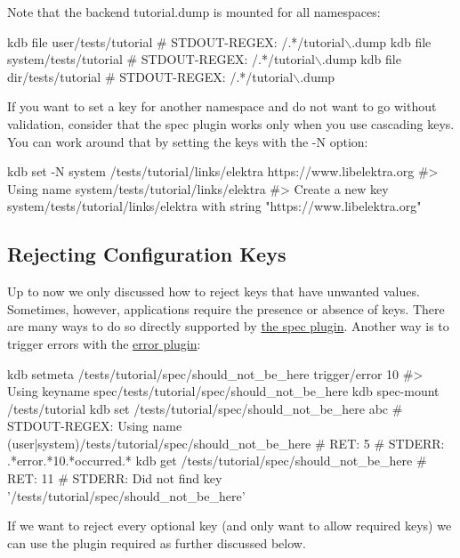 Note that the backend {\ttfamily tutorial.\+dump} is mounted for all namespaces\+:


\begin{DoxyCode}
kdb file user/tests/tutorial
# STDOUT-REGEX: /.*/tutorial\(\backslash\).dump
kdb file system/tests/tutorial
# STDOUT-REGEX: /.*/tutorial\(\backslash\).dump
kdb file dir/tests/tutorial
# STDOUT-REGEX: /.*/tutorial\(\backslash\).dump
\end{DoxyCode}


If you want to set a key for another namespace and do not want to go without validation, consider that the spec plugin works only when you use cascading keys. You can work around that by setting the keys with the {\ttfamily -\/N} option\+:


\begin{DoxyCode}
kdb set -N system /tests/tutorial/links/elektra https://www.libelektra.org
#> Using name system/tests/tutorial/links/elektra
#> Create a new key system/tests/tutorial/links/elektra with string "https://www.libelektra.org"
\end{DoxyCode}


\subsection*{Rejecting Configuration Keys}

Up to now we only discussed how to reject keys that have unwanted values. Sometimes, however, applications require the presence or absence of keys. There are many ways to do so directly supported by \hyperlink{md_src_plugins_spec_README_src_plugins_spec_README_md}{the spec plugin}. Another way is to trigger errors with the \hyperlink{md_src_plugins_error_README_src_plugins_error_README_md}{error plugin}\+:


\begin{DoxyCode}
kdb setmeta /tests/tutorial/spec/should\_not\_be\_here trigger/error 10
#> Using keyname spec/tests/tutorial/spec/should\_not\_be\_here
kdb spec-mount /tests/tutorial
kdb set /tests/tutorial/spec/should\_not\_be\_here abc
# STDOUT-REGEX: Using name (user|system)/tests/tutorial/spec/should\_not\_be\_here
# RET:    5
# STDERR: .*error.*10.*occurred.*
kdb get /tests/tutorial/spec/should\_not\_be\_here
# RET: 11
# STDERR: Did not find key '/tests/tutorial/spec/should\_not\_be\_here'
\end{DoxyCode}


If we want to reject every optional key (and only want to allow required keys) we can use the plugin {\ttfamily required} as further discussed below.

